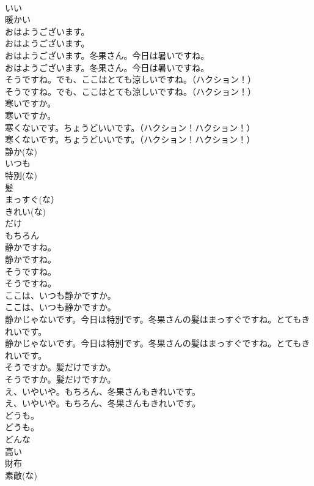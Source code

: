 \documentclass[8pt]{extreport}
\begin{document}
\begin{CJK}{UTF8}{min}
\\	いい
\\	暖かい
\\	おはようございます。	
\\	おはようございます。 
\\	おはようございます。冬果さん。今日は暑いですね。	
\\	おはようございます。冬果さん。今日は暑いですね。 
\\	そうですね。でも、ここはとても涼しいですね。（ハクション！）	
\\	そうですね。でも、ここはとても涼しいですね。（ハクション！） 
\\	寒いですか。	
\\	寒いですか。 
\\	寒くないです。ちょうどいいです。（ハクション！ハクション！）	
\\	寒くないです。ちょうどいいです。（ハクション！ハクション！） 
\\	静か(な)
\\	いつも
\\	特別(な)
\\	髪
\\	まっすぐ(な）
\\	きれい(な)
\\	だけ
\\	もちろん
\\	静かですね。	
\\	静かですね。 
\\	そうですね。	
\\	そうですね。 
\\	ここは、いつも静かですか。	
\\	ここは、いつも静かですか。 
\\	静かじゃないです。今日は特別です。冬果さんの髪はまっすぐですね。とてもきれいです。	
\\	静かじゃないです。今日は特別です。冬果さんの髪はまっすぐですね。とてもきれいです。 
\\	そうですか。髪だけですか。	
\\	そうですか。髪だけですか。 
\\	え、いやいや。もちろん、冬果さんもきれいです。	
\\	え、いやいや。もちろん、冬果さんもきれいです。 
\\	どうも。	
\\	どうも。 
\\	どんな
\\	高い
\\	財布
\\	素敵(な)

\end{CJK}
\end{document}

